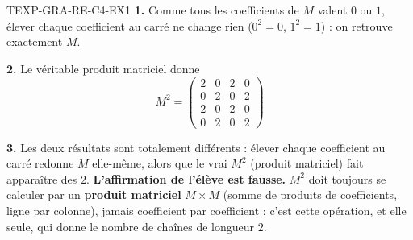 \begin{corrige}{TEXP-GRA-RE-C4-EX1}
\textbf{1.} Comme tous les coefficients de $M$ valent $0$ ou $1$, élever chaque coefficient au carré ne change rien ($0^2=0$, $1^2=1$) : on retrouve exactement $M$.

\textbf{2.} Le véritable produit matriciel donne
$$M^2=\begin{pmatrix}2&0&2&0\\0&2&0&2\\2&0&2&0\\0&2&0&2\end{pmatrix}$$

\textbf{3.} Les deux résultats sont totalement différents : élever chaque coefficient au carré redonne $M$ elle-même, alors que le vrai $M^2$ (produit matriciel) fait apparaître des $2$. \textbf{L'affirmation de l'élève est fausse.} $M^2$ doit toujours se calculer par un \textbf{produit matriciel} $M\times M$ (somme de produits de coefficients, ligne par colonne), jamais coefficient par coefficient : c'est cette opération, et elle seule, qui donne le nombre de chaînes de longueur $2$.
\end{corrige}
